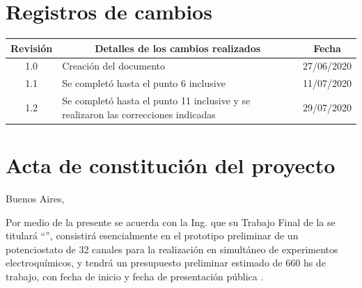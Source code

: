 \documentclass[11pt]{charter}
\begin{document}
\maketitle
\thispagestyle{empty}
\pagebreak


\thispagestyle{empty}
{\setlength{\parskip}{0pt}
\tableofcontents{}
}
\pagebreak


\section{Registros de cambios}
\label{sec:registro}


\begin{table}[ht]
\label{tab:registro}
\centering

\begin{tabularx}{\linewidth}{@{}|c|X|c|@{}}
\hline
\rowcolor[HTML]{C0C0C0} 
Revisión & \multicolumn{1}{c|}{\cellcolor[HTML]{C0C0C0}Detalles de los cambios realizados} & Fecha      \\ \hline
1.0      & Creación del documento     & 27/06/2020 \\ \hline
1.1      & Se completó hasta el punto 6 inclusive  & 11/07/2020  \\ \hline
1.2      & Se completó hasta el punto 11 inclusive y se realizaron las correcciones indicadas                  & 29/07/2020\\ \hline
\end{tabularx}
\end{table}

\pagebreak



\section{Acta de constitución del proyecto}
\label{sec:acta}

\begin{flushright}
Buenos Aires, \fechaInicioName
\end{flushright}

\vspace{2cm}

Por medio de la presente se acuerda con la Ing. \authorname\hspace{1px} que su Trabajo Final de la \degreename\hspace{1px} se titulará ``\ttitle'', consistirá esencialmente en el prototipo preliminar de un potenciostato de 32 canales para la realización en simultáneo de experimentos electroquímicos, y tendrá un presupuesto preliminar estimado de 660 hs de trabajo, con fecha de inicio \fechaInicioName\hspace{1px} y fecha de presentación pública \fechaFinalName.
\end{document}
